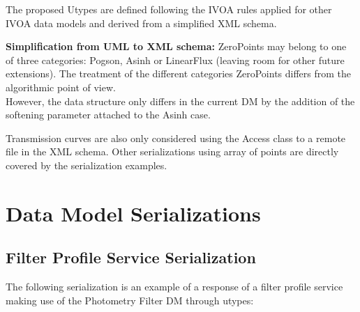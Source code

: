 \documentclass[11pt,a4paper]{ivoa}
\begin{document}
\begin{appendices}
The proposed Utypes are defined following the IVOA rules applied for other IVOA data models and derived from a simplified XML schema.
\par

\textbf{Simplification from UML to XML schema:}
ZeroPoints may belong to one of three categories: Pogson, Asinh or LinearFlux (leaving room for other future extensions). The treatment of the different categories ZeroPoints differs from the algorithmic point of view. \\
However, the data structure only differs in the current DM by the addition of the softening parameter attached to the Asinh case.
\par

Transmission curves are also only considered using the Access class to a remote file in the XML schema. Other serializations using array of points are directly covered by the serialization examples.
\par

\section{Data Model Serializations} \label{serialization}
\subsection{Filter Profile Service Serialization} \label{serializationfilter}

    
The following serialization is an example of a response of a filter profile service making use of the Photometry Filter DM through utypes:
\par



\end{appendices}
\end{document}
